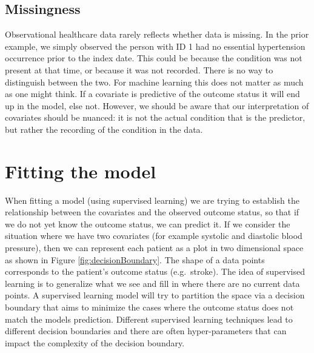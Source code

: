 \documentclass[11pt]{book}
\theoremstyle{definition}
\theoremstyle{definition}
\theoremstyle{definition}
\theoremstyle{remark}
\begin{document}
\hypertarget{missingness}{%
\subsection{Missingness}\label{missingness}}

Observational healthcare data rarely reflects whether data is missing. In the prior example, we simply observed the person with ID 1 had no essential hypertension occurrence prior to the index date. This could be because the condition was not present at that time, or because it was not recorded. There is no way to distinguish between the two. For machine learning this does not matter as much as one might think. If a covariate is predictive of the outcome status it will end up in the model, else not. However, we should be aware that our interpretation of covariates should be nuanced: it is not the actual condition that is the predictor, but rather the recording of the condition in the data.

\hypertarget{modelFitting}{%
\section{Fitting the model}\label{modelFitting}}

When fitting a model (using supervised learning) we are trying to establish the relationship between the covariates and the observed outcome status, so that if we do not yet know the outcome status, we can predict it. If we consider the situation where we have two covariates (for example systolic and diastolic blood pressure), then we can represent each patient as a plot in two dimensional space as shown in Figure \ref{fig:decisionBoundary}. The shape of a data points corresponds to the patient's outcome status (e.g.~stroke). The idea of supervised learning is to generalize what we see and fill in where there are no current data points. A supervised learning model will try to partition the space via a decision boundary that aims to minimize the cases where the outcome status does not match the models prediction. Different supervised learning techniques lead to different decision boundaries and there are often hyper-parameters that can impact the complexity of the decision boundary.
\end{document}
